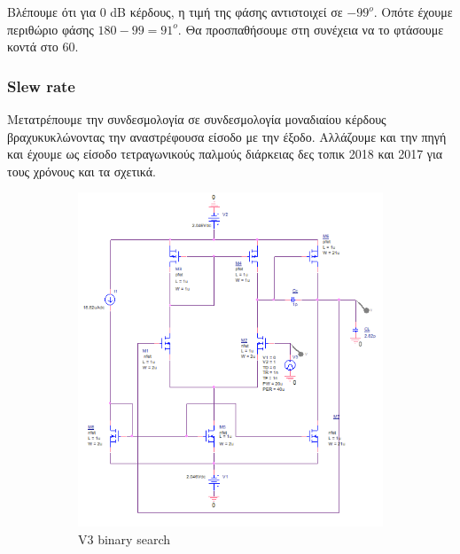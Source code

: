 \documentclass[12pt, a4paper]{article}
\begin{document}
Βλέπουμε ότι για 0 dB κέρδους, η τιμή της φάσης αντιστοιχεί σε $-99^o$. Οπότε έχουμε περιθώριο φάσης $180 - 99 = 91^ο$. Θα προσπαθήσουμε στη συνέχεια να το φτάσουμε κοντά στο 60. 

\subsubsection{Slew rate}

Μετατρέπουμε την συνδεσμολογία σε συνδεσμολογία μοναδιαίου κέρδους βραχυκυκλώνοντας την αναστρέφουσα είσοδο με την έξοδο. Αλλάζουμε και την πηγή και έχουμε ως είσοδο τετραγωνικούς παλμούς διάρκειας δες τοπικ 2018 και 2017 για τους χρόνους και τα σχετικά.


\begin{figure}[h!]
     \begin{subfigure}[b]{0.5\textwidth}
         \centering
         \includegraphics[height=.4\textheight, width=\textwidth, keepaspectratio]{assets/slew_rate_circuit.png}
    \caption{V3 binary search}
     \end{subfigure}
     \begin{subfigure}[b]{0.5\textwidth}
         \centering

\end{subfigure}
\end{figure}
\end{document}
